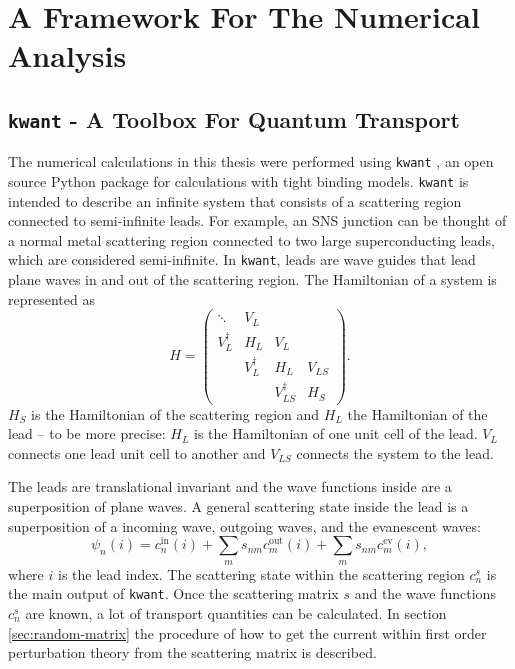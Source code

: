 \chapter{A Framework For The Numerical Analysis}
\label{ch:basics-numerical}
\section{\texttt{kwant} - A Toolbox For Quantum Transport}
The numerical calculations in this thesis were performed using \texttt{kwant} \cite{Groth2014}, an open source Python package for calculations with tight binding models. \texttt{kwant} is intended to describe an infinite system that consists of a scattering region connected to semi-infinite leads. For example, an SNS junction can be thought of a normal metal scattering region connected to two large superconducting leads, which are considered semi-infinite. In \texttt{kwant}, leads are wave guides that lead plane waves in and out of the scattering region. The Hamiltonian of  a system is represented as
\begin{equation}
H = \begin{pmatrix}
\ddots & V_L & &  \\
V_L^\dagger & H_L & V_L &   \\
 & V_L^\dagger & H_L & V_{LS} \\
 & & V_{LS}^\dagger & H_S 
\end{pmatrix}.
\end{equation}
$H_S$ is the Hamiltonian of the scattering region and $H_L$ the Hamiltonian of the lead -- to be more precise: $H_L$ is the Hamiltonian of one unit cell of the lead. $V_L$ connects one lead unit cell to another and $V_{LS}$ connects the system to the lead.

The leads are translational invariant and the wave functions inside are a superposition of plane waves. A general scattering state inside the lead is a superposition of a incoming wave, outgoing waves, and the evanescent waves:
\begin{equation}
\psi_n ( i ) = c_n^\text{in} ( i ) + \sum_m s_{nm} c_m^\text{out} ( i ) + \sum_m s_{nm} c_m^\text{ev} ( i ),
\end{equation}
where $i$ is the lead index. The scattering state within the scattering region $c_n^s$ is the main output of \texttt{kwant}. Once the scattering matrix $s$ and the wave functions $c_n^s$ are known, a lot of transport quantities can be calculated. In section \ref{sec:random-matrix} the procedure of how to get the current within first order perturbation theory from the scattering matrix is described.

